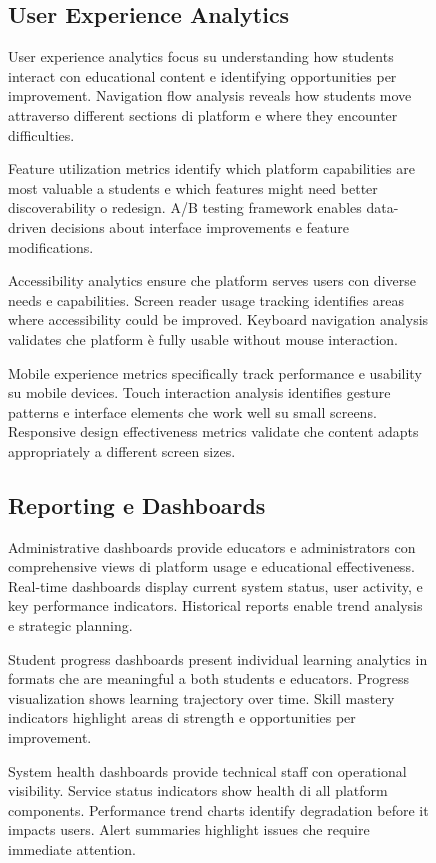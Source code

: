 \documentclass[12pt,a4paper]{article}
\begin{document}
\begin{figure}[H]
\subsection{User Experience Analytics}

User experience analytics focus su understanding how students interact con educational content e identifying opportunities per improvement. Navigation flow analysis reveals how students move attraverso different sections di platform e where they encounter difficulties.

Feature utilization metrics identify which platform capabilities are most valuable a students e which features might need better discoverability o redesign. A/B testing framework enables data-driven decisions about interface improvements e feature modifications.

Accessibility analytics ensure che platform serves users con diverse needs e capabilities. Screen reader usage tracking identifies areas where accessibility could be improved. Keyboard navigation analysis validates che platform è fully usable without mouse interaction.

Mobile experience metrics specifically track performance e usability su mobile devices. Touch interaction analysis identifies gesture patterns e interface elements che work well su small screens. Responsive design effectiveness metrics validate che content adapts appropriately a different screen sizes.

\subsection{Reporting e Dashboards}

Administrative dashboards provide educators e administrators con comprehensive views di platform usage e educational effectiveness. Real-time dashboards display current system status, user activity, e key performance indicators. Historical reports enable trend analysis e strategic planning.

Student progress dashboards present individual learning analytics in formats che are meaningful a both students e educators. Progress visualization shows learning trajectory over time. Skill mastery indicators highlight areas di strength e opportunities per improvement.

System health dashboards provide technical staff con operational visibility. Service status indicators show health di all platform components. Performance trend charts identify degradation before it impacts users. Alert summaries highlight issues che require immediate attention.


\end{figure}
\end{document}
